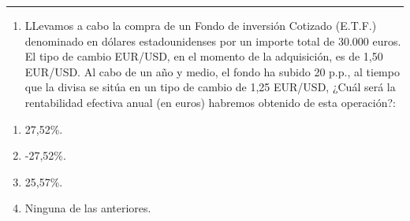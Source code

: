 \documentclass[
  letterpaper,
  DIV=11,
  numbers=noendperiod]{scrreprt}
\providecommand{\tightlist}{%
  \setlength{\itemsep}{0pt}\setlength{\parskip}{0pt}}\usepackage{longtable,booktabs,array}
\begin{document}
\begin{center}\rule{0.5\linewidth}{0.5pt}\end{center}

\begin{enumerate}
\def\labelenumi{\arabic{enumi}.}
\setcounter{enumi}{27}
\tightlist
\item
  LLevamos a cabo la compra de un Fondo de inversión Cotizado (E.T.F.)
  denominado en dólares estadounidenses por un importe total de 30.000
  euros. El tipo de cambio EUR/USD, en el momento de la adquisición, es
  de 1,50 EUR/USD. Al cabo de un año y medio, el fondo ha subido 20
  p.p., al tiempo que la divisa se sitúa en un tipo de cambio de 1,25
  EUR/USD, ¿Cuál será la rentabilidad efectiva anual (en euros) habremos
  obtenido de esta operación?:
\end{enumerate}

\begin{enumerate}
\def\labelenumi{\alph{enumi})}
\item
  27,52\%.
\item
  -27,52\%.
\item
  25,57\%.
\item
  Ninguna de las anteriores.
\end{enumerate}
\end{document}
